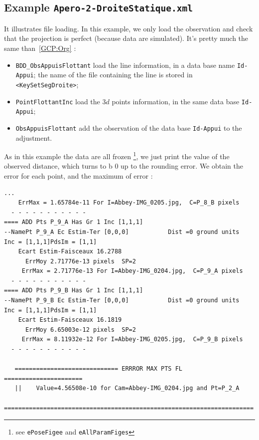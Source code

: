 
\subsection{Example {\tt Apero-2-DroiteStatique.xml}}

\label{Apero-2-DroiteStatique}

It illustrates file loading.
In this example, we only load the observation and check that the projection is perfect (because data
are simulated). It's pretty much the same than~\ref{GCP:Org} :

\begin{itemize}
   \item {\tt BDD\_ObsAppuisFlottant} load the line information, in a data base name {\tt Id-Appui};
         the name of the file containing the line is stored in {\tt  <KeySetSegDroite>};
   \item {\tt PointFlottantInc} load the $3d$ points information, in the same data base {\tt Id-Appui};
   \item {\tt ObsAppuisFlottant} add the observation of the data base {\tt Id-Appui} to the adjustment.
\end{itemize}

As in this example the data are all frozen \footnote{see {\tt ePoseFigee} and {\tt eAllParamFiges}}, we just print the
value of the observed distance, which turns to b $0$ up to the rounding error. We obtain the error for each point, and
the maximum of error :


\begin{verbatim}
...
    ErrMax = 1.65784e-11 For I=Abbey-IMG_0205.jpg,  C=P_8_B pixels
  - - - - - - - - - - -
==== ADD Pts P_9_A Has Gr 1 Inc [1,1,1]
--NamePt P_9_A Ec Estim-Ter [0,0,0]           Dist =0 ground units
Inc = [1,1,1]PdsIm = [1,1]
    Ecart Estim-Faisceaux 16.2788
      ErrMoy 2.71776e-13 pixels  SP=2
     ErrMax = 2.71776e-13 For I=Abbey-IMG_0204.jpg,  C=P_9_A pixels
  - - - - - - - - - - -
==== ADD Pts P_9_B Has Gr 1 Inc [1,1,1]
--NamePt P_9_B Ec Estim-Ter [0,0,0]           Dist =0 ground units
Inc = [1,1,1]PdsIm = [1,1]
    Ecart Estim-Faisceaux 16.1819
      ErrMoy 6.65003e-12 pixels  SP=2
     ErrMax = 8.11932e-12 For I=Abbey-IMG_0205.jpg,  C=P_9_B pixels
  - - - - - - - - - - -

   ============================= ERRROR MAX PTS FL ======================
   ||    Value=4.56508e-10 for Cam=Abbey-IMG_0204.jpg and Pt=P_2_A
   ======================================================================
\end{verbatim}

